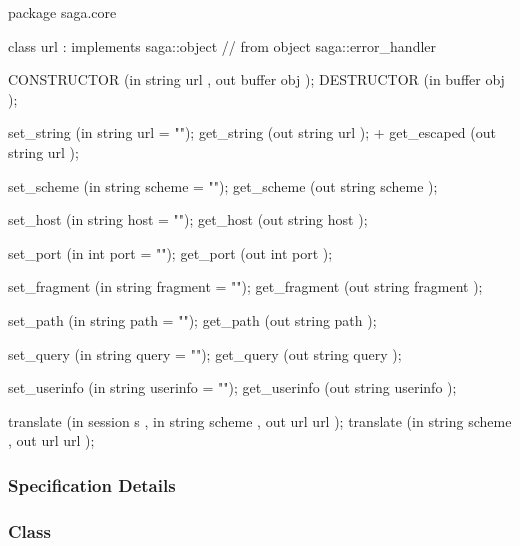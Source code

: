 \begin{myspec}
  package saga.core
  {
    class url : implements   saga::object
             // from object  saga::error_handler
    {
      CONSTRUCTOR   (in  string     url       ,
                     out buffer     obj       );
      DESTRUCTOR    (in  buffer     obj       );
 
      set_string    (in  string     url       = "");
      get_string    (out string     url       );
+     get_escaped   (out string     url       );
 
      set_scheme    (in  string     scheme    = "");
      get_scheme    (out string     scheme    );
 
      set_host      (in  string     host      = "");
      get_host      (out string     host      );
 
      set_port      (in  int        port      = "");
      get_port      (out int        port      );
 
      set_fragment  (in  string     fragment  = "");
      get_fragment  (out string     fragment  );
 
      set_path      (in  string     path      = "");
      get_path      (out string     path      );
 
      set_query     (in  string     query     = "");
      get_query     (out string     query     );
 
      set_userinfo  (in  string     userinfo  = "");
      get_userinfo  (out string     userinfo  );
 
      translate     (in  session    s         ,
                     in  string     scheme    ,
                     out url        url       );
      translate     (in  string     scheme    ,
                     out url        url       );
    }
  }
 \end{myspec}
 
 
 \subsubsection{Specification Details}
 
 \subsubsection*{Class }
 
